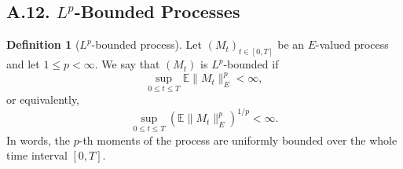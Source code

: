 \documentclass[11pt]{article}
\theoremstyle{definition}
\newtheorem{definition}{Definition}
\theoremstyle{remark}
\begin{document}
\subsection*{A.12. \(L^p\)-Bounded Processes}
\begin{definition}[\(L^p\)-bounded process]
Let \((M_t)_{t\in[0,T]}\) be an \(E\)-valued process and let \(1\le p<\infty\). We say that \((M_t)\) is \(L^p\)-bounded if
\[
\sup_{0\le t\le T}\mathbb E\|M_t\|_E^p<\infty,
\]
or equivalently,
\[
\sup_{0\le t\le T}\left(\mathbb E\|M_t\|_E^p\right)^{1/p}<\infty.
\]
In words, the \(p\)-th moments of the process are uniformly bounded over the whole time interval \([0,T]\).
\end{definition}
\end{document}
